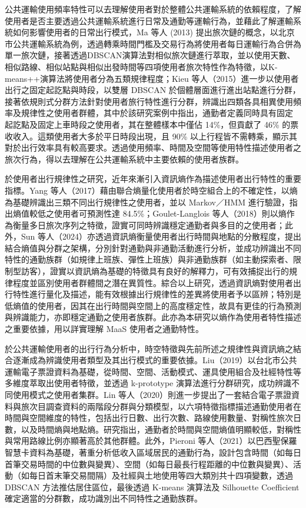 公共運輸使用頻率特性可以去理解使用者對於整體公共運輸系統的依賴程度，了解使用者是否主要透過公共運輸系統進行日常及通勤等運輸行為，並藉此了解運輸系統如何影響使用者的日常出行模式，Ma
等人 (2013)
提出旅次鏈的概念，以北京市公共運輸系統為例，透過轉乘時間門檻及交易行為將使用者每日運輸行為合併為單一旅次鏈，接著透過DBSCAN演算法對相似旅次鏈進行萃取，並以使用天數、相似路線、相似站點與相似出發時間等四項使用者旅次特性作為特徵，以K-means++演算法將使用者分為五類規律程度；Kieu
等人（2015）進一步以使用者出行之固定起訖點與時段，以雙層 DBSCAN
於個體層面進行進出站點進行分群，接著依規則式分群方法針對使用者旅行特性進行分群，辨識出四類各具相異使用頻率及規律性之使用者群體，其中於該研究案例中指出，通勤者定義同時具有固定
起訖點及固定上車時段之使用者，其在整體樣本中僅佔 14\%，但貢獻了 46\%
的票收收入。這類使用者大多於平日時段出現，且 90\%
以上行程皆不需轉乘，顯示其對於出行效率具有較高要求。透過使用頻率、時間及空間等使用特性描述使用者之旅次行為，得以去理解在公共運輸系統中主要依賴的使用者族群。

於使用者出行規律性之研究，近年來漸引入資訊熵作為描述使用者出行特性的重要指標。Yang
等人（2017）藉由聯合熵量化使用者於時空組合上的不確定性，以熵為基礎辨識出三類不同出行規律性之使用者，並以
Markov／HMM 進行驗證，指出熵值較低之使用者可預測性達
84.5\%；Goulet-Langlois
等人（2018）則以熵作為衡量多日旅次序列之特徵，證實可同時辨識穩定通勤者與多目的之使用者；此外，Sun
等人（2024）亦透過資訊熵衡量使用者出行時間與地點的分散程度，提出結合熵值與分群之架構，分別針對通勤與非通勤活動進行分析，並成功辨識出不同特性的通勤族群（如規律上班族、彈性上班族）與非通勤族群（如主動探索者、限制型訪客），證實以資訊熵為基礎的特徵具有良好的解釋力，可有效捕捉出行的規律程度並區別使用者群體間之潛在異質性。綜合以上研究，透過資訊熵對使用者出行特性進行量化及描述，能有效根據出行規律性的差異將使用者予以區辨；特別是低熵值的使用者，因其在出行時間與空間上的高度穩定性，故具有更佳的行為預測與辨識能力，亦即穩定通勤之使用者族群。此亦為本研究以熵作為使用者特性描述之重要依據，用以詳實理解
MaaS 使用者之通勤特性。

於公共運輸使用者的出行行為分析中，時空特徵與先前所述之規律性與資訊熵之結合逐漸成為辨識使用者類型及其出行模式的重要依據。Liu（2019）以台北市公共運輸電子票證資料為基礎，從時間、空間、活動模式、運具使用組合及社經特性等多維度萃取出使用者特徵，並透過
k-prototype 演算法進行分群研究，成功辨識不同使用模式之使用者集群。Lin
等人（2020）則進一步提出了一套結合電子票證資料與旅次目調查資料的兩階段分群與分類模型，以六項特徵指標描述通勤使用者在時間與空間維度的特性，包括出行日數、出行次數、路線使用數量、對稱性旅次日數，以及時間熵與地點熵。研究指出，通勤者於時間與空間熵值明顯較低，對稱性與常用路線比例亦顯著高於其他群體。此外，Pieroni
等人（2021）以巴西聖保羅智慧卡資料為基礎，著重分析低收入區域居民的通勤行為，設計包含時間（如每日首筆交易時間的中位數與變異）、空間（如每日最長行程距離的中位數與變異）、活動（如每日首末筆交易間隔）及社經與土地使用等四大類別共十四項變數，透過
DBSCAN 方法推估居住區位，最後透過 K-means 演算法及 Silhouette
Coefficient 確定適當的分群數，成功識別出不同特性之通勤族群。

